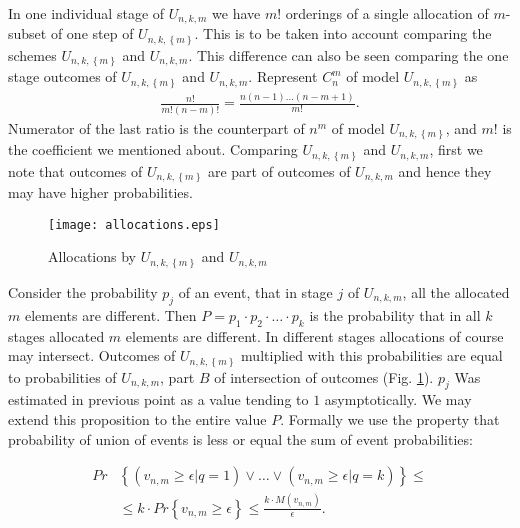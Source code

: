\documentclass[conference]{IEEEtran}
\begin{document}
In one individual stage of $U_{n,k,m}$ we have $m!$ orderings of a single allocation of $m$-subset of one step of $U_{n,k,\left\{m\right\}}$. This is to be taken into account comparing the schemes $U_{n,k,\left\{m\right\}}$ and $U_{n,k,m}$. This difference can also be seen comparing the one stage outcomes of $U_{n,k,\left\{m\right\}}$ and $U_{n,k,m}$. Represent $C_{n}^{m}$ of model $U_{n,k,\left\{m\right\}}$ as 
\begin{align}
\frac{n!}{m!(n-m)!}=\frac{n(n-1) \ldots (n-m+1)}{m!}.
\end{align}
Numerator of the last ratio is the counterpart of $n^{m}$ of model $U_{n,k,\left\{m\right\}}$, and $m!$ is the coefficient we mentioned about. Comparing $U_{n,k,\left\{m\right\}}$ and $U_{n,k,m}$, first we note that outcomes of $U_{n,k,\left\{m\right\}}$ are part of outcomes of $U_{n,k,m}$ and hence they may have higher probabilities.
\begin{figure}[tb]
\begin{center}
\begin{minipage}[h]{\linewidth}  
\texttt{[image: allocations.eps]}
\end{minipage}
\end{center}
\caption{Allocations by $U_{n,k,\left\{m\right\}}$ and $U_{n,k,m}$}
\label{fig:allocations}
\end{figure}
Consider the probability $p_{j}$ of an event, that in stage $j$ of $U_{n,k,m}$, all the allocated $m$ elements are different. Then $P=p_{1} \cdot p_{2} \cdot \ldots \cdot p_{k}$ is the probability that in all $k$ stages allocated $m$ elements are different. In different stages allocations of course may intersect. Outcomes of $U_{n,k,\left\{m\right\}}$ multiplied with this probabilities are equal to probabilities of $U_{n,k,m}$, part $B$ of intersection of outcomes (Fig. \ref{fig:allocations}). $p_{j}$ Was estimated in previous point as a value tending to $1$ asymptotically. We may extend this proposition to the entire value $P$.
Formally we use the property that probability of union of events is less or equal the sum of event probabilities:

\begin{align}
Pr & \left\{(v_{n,m} \geq \epsilon | q=1) \vee \ldots \vee (v_{n,m} \geq \epsilon | q=k) \right\} \leq \nonumber \\
&\leq k \cdot Pr\left\{v_{n,m} \geq \epsilon \right\} \leq \frac{k \cdot M(v_{n,m})}{\epsilon}.
\end{align}
\end{document}
